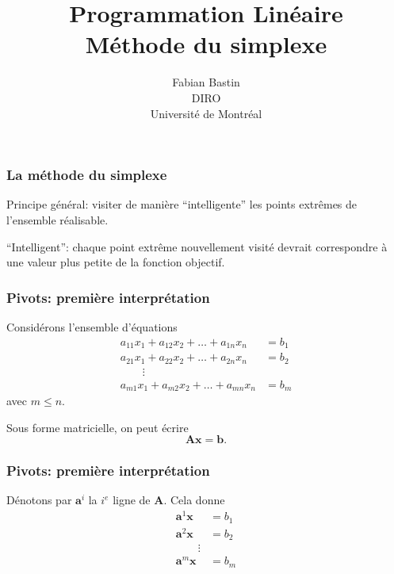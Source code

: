 \documentclass[t,usepdftitle=false]{beamer}
\title[Méthode du simplexe]{Programmation Linéaire\\Méthode du simplexe}
\author[Fabian Bastin]{Fabian Bastin\\DIRO\\Université de Montréal}
\date{}
\def\ba{\boldsymbol{a}}
\def\bb{\boldsymbol{b}}
\def\bx{\boldsymbol{x}}
\def\bA{\boldsymbol{A}}
\begin{document}
\frame{\titlepage}

\begin{frame}
\frametitle{La méthode du simplexe}

Principe général: visiter de manière ``intelligente'' les points extrêmes de l'ensemble réalisable.

\mbox{}

``Intelligent'': chaque point extrême nouvellement visité devrait correspondre à une valeur plus petite de la fonction objectif.

\end{frame}
\begin{frame}
\frametitle{Pivots: première interprétation}

Considérons l'ensemble d'équations
\begin{align*}
a_{11}x_1 + a_{12}x_2 + \ldots + a_{1n}x_n &= b_1 \\
a_{21}x_1 + a_{22}x_2 + \ldots + a_{2n}x_n &= b_2 \\
\qquad \vdots \\
a_{m1}x_1 + a_{m2}x_2 + \ldots + a_{mn}x_n &= b_m
\end{align*}
avec $m \leq n$.

\mbox{}

Sous forme matricielle, on peut écrire
\[
\bA \bx = \bb.
\]

\end{frame}

\begin{frame}
\frametitle{Pivots: première interprétation}

Dénotons par $\ba^i$ la $i^e$ ligne de $\bA$. Cela donne
\begin{align*}
\ba^1 \bx &= b_1 \\
\ba^2 \bx &= b_2 \\
\qquad \vdots \\
\ba^m \bx &= b_m
\end{align*}

\end{frame}
\end{document}
